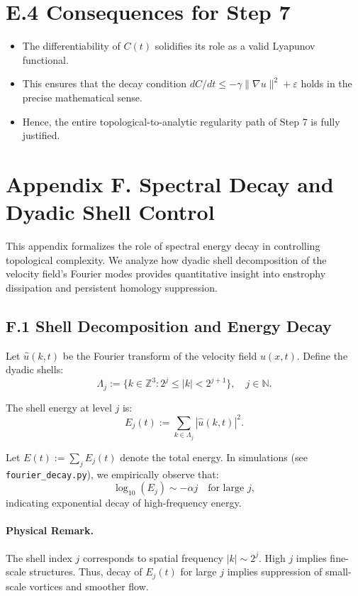 \documentclass[11pt]{article}
\theoremstyle{definition}
\begin{document}
\section*{E.4 Consequences for Step 7}
\begin{itemize}
  \item The differentiability of $C(t)$ solidifies its role as a valid Lyapunov functional.
  \item This ensures that the decay condition $dC/dt \leq -\gamma \|\nabla u\|^2 + \varepsilon$ holds in the precise mathematical sense.
  \item Hence, the entire topological-to-analytic regularity path of Step 7 is fully justified.
\end{itemize}


\section*{Appendix F. Spectral Decay and Dyadic Shell Control}

This appendix formalizes the role of spectral energy decay in controlling topological complexity. We
analyze how dyadic shell decomposition of the velocity field’s Fourier modes provides quantitative
insight into enstrophy dissipation and persistent homology suppression.

\subsection*{F.1 Shell Decomposition and Energy Decay}

Let \( \hat{u}(k, t) \) be the Fourier transform of the velocity field \( u(x, t) \). Define the dyadic shells:
\[ 
\Lambda_j := \{k \in \mathbb{Z}^3 : 2^j \leq |k| < 2^{j+1}\}, \quad j \in \mathbb{N}. 
\]

The shell energy at level \( j \) is:
\[ 
E_j(t) := \sum_{k \in \Lambda_j} |\hat{u}(k, t)|^2.
\]

Let \( E(t) := \sum_j E_j(t) \) denote the total energy. In simulations (see \texttt{fourier\_decay.py}), we
empirically observe that:
\[ 
\log_{10}(E_j) \sim -\alpha j \quad \text{for large } j, 
\]
indicating exponential decay of high-frequency energy.

\paragraph{Physical Remark.} The shell index \( j \) corresponds to spatial frequency \( |k| \sim 2^j \). High \( j \)
implies fine-scale structures. Thus, decay of \( E_j(t) \) for large \( j \) implies suppression of small-scale vortices
and smoother flow.
\end{document}
